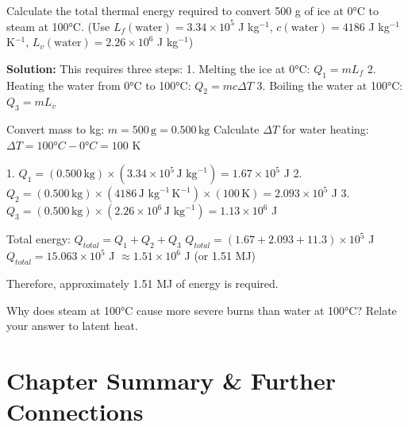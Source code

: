 \begin{example}
Calculate the total thermal energy required to convert 500 g of ice at 0°C to steam at 100°C.
(Use \(L_f(\text{water}) = 3.34 \times 10^5\) J kg\(^{-1}\), \(c(\text{water}) = 4186\) J kg\(^{-1}\) K\(^{-1}\), \(L_v(\text{water}) = 2.26 \times 10^6\) J kg\(^{-1}\))

\textbf{Solution:}
This requires three steps:
1.  Melting the ice at 0°C: \(Q_1 = mL_f\)
2.  Heating the water from 0°C to 100°C: \(Q_2 = mc\Delta T\)
3.  Boiling the water at 100°C: \(Q_3 = mL_v\)

Convert mass to kg: \(m = 500\,\text{g} = 0.500\,\text{kg}\)
Calculate \(\Delta T\) for water heating: \(\Delta T = 100°C - 0°C = 100\) K

1.  \(Q_1 = (0.500\,\text{kg}) \times (3.34 \times 10^5\,\text{J kg}^{-1}) = 1.67 \times 10^5\) J
2.  \(Q_2 = (0.500\,\text{kg}) \times (4186\,\text{J kg}^{-1}\,\text{K}^{-1}) \times (100\,\text{K}) = 2.093 \times 10^5\) J
3.  \(Q_3 = (0.500\,\text{kg}) \times (2.26 \times 10^6\,\text{J kg}^{-1}) = 1.13 \times 10^6\) J

Total energy: \(Q_{total} = Q_1 + Q_2 + Q_3\)
\(Q_{total} = (1.67 + 2.093 + 11.3) \times 10^5\) J
\(Q_{total} = 15.063 \times 10^5\) J \(\approx 1.51 \times 10^6\) J (or 1.51 MJ)

Therefore, approximately 1.51 MJ of energy is required.
\end{example}

\begin{stopandthink}
Why does steam at 100°C cause more severe burns than water at 100°C? Relate your answer to latent heat.
\end{stopandthink}


\FloatBarrier

\section{Chapter Summary \& Further Connections}
\label{sec:thermo_summary}
\FloatBarrier

